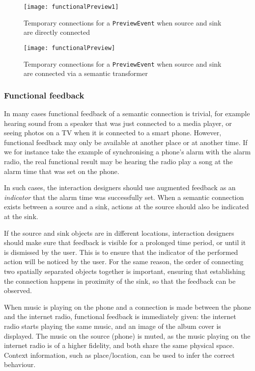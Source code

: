 \begin{figure}
\centering
\texttt{[image: functionalPreview1]}
\caption{Temporary connections for a \texttt{PreviewEvent} when source and sink are directly connected}
\label{functionalPreview1}
\end{figure}

\begin{figure}
\centering
\texttt{[image: functionalPreview]}
\caption{Temporary connections for a \texttt{PreviewEvent} when source and sink are connected via a semantic transformer}
\label{functionalPreview}
\end{figure}

\subsubsection{Functional feedback}
In many cases functional feedback of a semantic connection is trivial, for example hearing sound from a speaker that was just connected to a media player, or seeing photos on a TV when it is connected to a smart phone. However, functional feedback may only be available at another place or at another time. If we for instance take the example of synchronising a phone's alarm with the alarm radio, the real functional result may be hearing the radio play a song at the alarm time that was set on the phone. 

In such cases, the interaction designers should use augmented feedback as an \emph{indicator} that the alarm time was successfully set. When a semantic connection exists between a source and a sink, actions at the source should also be indicated at the sink. 

If the source and sink objects are in different locations, interaction designers should make sure that feedback is visible for a prolonged time period, or until it is dismissed by the user. This is to ensure that the indicator of the performed action will be noticed by the user. For the same reason, the order of connecting two spatially separated objects together is important, ensuring that establishing the connection happens in proximity of the sink, so that the feedback can be observed. 

\begin{example}
When music is playing on the phone and a connection is made between the phone and the internet radio, functional feedback is immediately given: the internet radio starts playing the same music, and an image of the album cover is displayed. The music on the source (phone) is muted, as the music playing on the internet radio is of a higher fidelity, and both share the same physical space. Context information, such as place/location, can be used to infer the correct behaviour.
\end{example}


